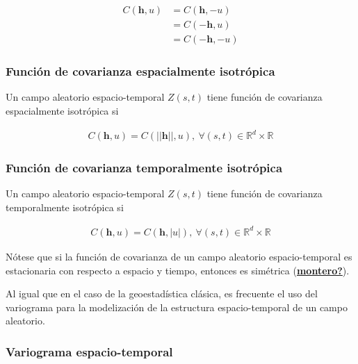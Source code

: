 \documentclass[
]{book}
\begin{document}
\begin{align}
C(\textbf{h}, u)&=C(\textbf{h},-u)\\
&=C(-\textbf{h}, u)\\
&=C(-\textbf{h}, -u)
\end{align}

\hypertarget{funciuxf3n-de-covarianza-espacialmente-isotruxf3pica}{%
\subsubsection*{Función de covarianza espacialmente isotrópica}\label{funciuxf3n-de-covarianza-espacialmente-isotruxf3pica}}

Un campo aleatorio espacio-temporal \(Z(s,t)\) tiene función de covarianza espacialmente isotrópica si

\begin{align}
C(\textbf{h},u)=C(||\textbf{h}||,u), \ \forall(s,t) \in \mathbb{R}^d \times \mathbb{R}
\end{align}

\hypertarget{funciuxf3n-de-covarianza-temporalmente-isotruxf3pica}{%
\subsubsection*{Función de covarianza temporalmente isotrópica}\label{funciuxf3n-de-covarianza-temporalmente-isotruxf3pica}}

Un campo aleatorio espacio-temporal \(Z(s,t)\) tiene función de covarianza temporalmente isotrópica si

\begin{align}
C(\textbf{h},u)=C(\textbf{h},|u|), \ \forall(s,t) \in \mathbb{R}^d \times \mathbb{R}
\end{align}

Nótese que si la función de covarianza de un campo aleatorio espacio-temporal es estacionaria con respecto a espacio y tiempo, entonces es simétrica (\protect\hyperlink{ref-montero}{\textbf{montero?}}).

Al igual que en el caso de la geoestadística clásica, es frecuente el uso del variograma para la modelización de la estructura espacio-temporal de un campo aleatorio.

\hypertarget{variograma-espacio-temporal}{%
\subsubsection*{Variograma espacio-temporal}\label{variograma-espacio-temporal}}
\end{document}
